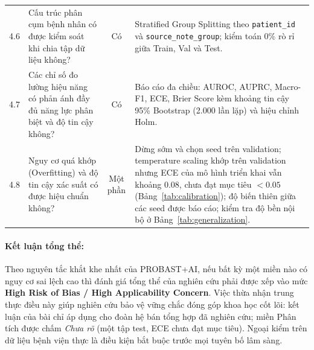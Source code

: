 \begin{table}[htbp]
\begin{tabularx}{\textwidth}{@{}cp{4.5cm}cp{5.2cm}@{}}
4.6 & Cấu trúc phân cụm bệnh nhân có được kiểm soát khi chia tập dữ liệu không? & Có & Stratified Group Splitting theo \texttt{patient\_id} và \texttt{source\_note\_group}; kiểm toán $0\%$ rò rỉ giữa Train, Val và Test. \\
4.7 & Các chỉ số đo lường hiệu năng có phản ánh đầy đủ năng lực phân biệt và độ tin cậy không? & Có & Báo cáo đa chiều: AUROC, AUPRC, Macro-F1, ECE, Brier Score kèm khoảng tin cậy 95\% Bootstrap (2.000 lần lặp) và hiệu chỉnh Holm. \\
4.8 & Nguy cơ quá khớp (Overfitting) và độ tin cậy xác suất có được hiệu chuẩn không? & Một phần & Dừng sớm và chọn seed trên validation; temperature scaling khớp trên validation nhưng ECE của mô hình triển khai vẫn khoảng 0.08, chưa đạt mục tiêu $<0.05$ (Bảng~\ref{tab:calibration}); độ biến thiên giữa các seed được báo cáo; kiểm tra độ bền nội bộ ở Bảng~\ref{tab:generalization}. \\
\bottomrule
\end{tabularx}
\end{table}

\paragraph{Kết luận tổng thể:} Theo nguyên tắc khắt khe nhất của PROBAST+AI, nếu bất kỳ một miền nào có nguy cơ sai lệch cao thì đánh giá tổng thể của nghiên cứu phải được xếp vào mức \textbf{High Risk of Bias / High Applicability Concern}. Việc thừa nhận trung thực điều này giúp nghiên cứu bảo vệ vững chắc đóng góp khoa học cốt lõi: kết luận của bài chỉ áp dụng cho đoàn hệ bán tổng hợp đã nghiên cứu; miền Phân tích được chấm \emph{Chưa rõ} (một tập test, ECE chưa đạt mục tiêu). Ngoại kiểm trên dữ liệu bệnh viện thực là điều kiện bắt buộc trước mọi tuyên bố lâm sàng.
